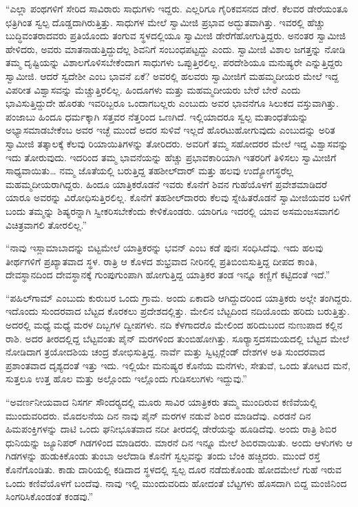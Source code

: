  “ಎಲ್ಲಾ ಪಂಥಗಳಿಗೆ ಸೇರಿದ ಸಾವಿರಾರು ಸಾಧುಗಳು ಇದ್ದರು. ಎಲ್ಲರಿಗೂ ಗೈರಿಕವಸನದ ಡೇರೆ. ಕೆಲವರ ಡೇರೆಯಂತೂ ಛತ್ರಿಗಿಂತ ಸ್ವಲ್ಪ ದೊಡ್ಡದಾಗಿರುತ್ತಿತ್ತು. ಸಾಧುಗಳ ಮೇಲೆ ಸ್ವಾಮೀಜಿ ಪ್ರಭಾವ ಅದ್ಭುತವಾಗಿತ್ತು. ಇವರಲ್ಲಿ ಹೆಚ್ಚು ಬುದ್ಧಿವಂತರಾದವರು ಪ್ರತಿಯೊಂದು ತಂಗುವ ಸ್ಥಳದಲ್ಲಿಯೂ ಸ್ವಾಮೀಜಿ ಡೇರೆಗೆ\break ಹೋಗುತ್ತಿದ್ದರು. ಅನಂತರ ಸ್ವಾಮೀಜಿ ಹೇಳಿದರು, ಅವರು ಮಾತನಾಡುತ್ತಿದ್ದುದೆಲ್ಲ ಶಿವನಿಗೆ ಸಂಬಂಧಪಟ್ಟದ್ದು ಎಂದು. ಸ್ವಾಮೀಜಿ ವಿಶಾಲ ಜಗತ್ತನ್ನು ನೋಡಿ ತಮ್ಮ ದೃಷ್ಟಿಯನ್ನು ವಿಶಾಲಗೊಳಿಸಬೇಕೆಂದಾಗ ಸಾಧುಗಳು ಒಪ್ಪುತ್ತಿರಲಿಲ್ಲ. ಪರದೇಶಿಯೂ ಮನುಷ್ಯರೇ ಎನ್ನುತ್ತಿದ್ದರು ಸ್ವಾಮೀಜಿ. ಆದರೆ ಸ್ವದೇಶೀ ಎಂಬ ಭಾವನೆ ಏಕೆ? ಅವರಲ್ಲಿ ಹಲವರು ಸ್ವಾಮೀಜಿಗೆ ಮಹಮ್ಮದೀಯರ ಮೇಲೆ ಇದ್ದ ವಿಪರೀತ ವಿಶ್ವಾಸವನ್ನು ಮೆಚ್ಚುತ್ತಿರಲಿಲ್ಲ. ಹಿಂದೂಗಳು ಮತ್ತು ಮಹಮ್ಮದೀಯರು ಬೇರೆ ಬೇರೆ ಎಂದು ಭಾವಿಸುತ್ತಿದ್ದುದೇ ಹೊರತು ಇವರಿಬ್ಬರೂ ಒಂದಾಗಬಲ್ಲರು ಎಂಬುದು ಅವರ ಭಾವನೆಗೂ ಸಿಲುಕದ ವಸ್ತುವಾಗಿತ್ತು. ಪಂಜಾಬು ಹಿಂದೂ ಧರ್ಮಕ್ಕಾಗಿ ಸತ್ತವರ ನೆತ್ತರಿಂದ ಒಣಗಿದೆ. ಇಲ್ಲಿಯಾದರೂ ಸ್ವಲ್ಪ ಮತಾಂಧತೆಯನ್ನು ಅಭ್ಯಾಸಮಾಡಬೇಕೆಂಬ ಅವರ ಇಚ್ಛೆ ಮುಂದೆ ಅದರ ಸುಳಿವೆ ಇಲ್ಲದೆ ಹೊರಟುಹೋಗುವುದು ಎಂಬುದನ್ನು ಅರಿತ ಸ್ವಾಮೀಜಿ ತತ್ಕಾಲಕ್ಕೆ ಕೆಲವು ರಿಯಾಯಿತಿಗಳನ್ನು ತೋರಿದರು. ಅವರಿಗೆ ತಮ್ಮ ಸಹೋದರರ ಮೇಲೆ ಇದ್ದ ವಿಶ್ವಾಸವನ್ನು ಇದು ತೋರುವುದು. ಇದರಿಂದ ತಮ್ಮ ಭಾವನೆಯನ್ನು ಹೆಚ್ಚು ಪ್ರಭಾವಕಾರಿಯಾಗಿ ಇತರರಿಗೆ ತಿಳಿಸಲು ಸ್ವಾಮೀಜಿಗೆ ಸಾಧ್ಯವಾಯಿತು… ನಮ್ಮ ಜೊತೆಯಲ್ಲಿ ಬರುತ್ತಿದ್ದ ತಹಶೀಲ್‍ದಾರ್ ಮತ್ತು ಹಲವು ಉದ್ಯೋಗಸ್ಥರೆಲ್ಲ ಮಹಮ್ಮದೀಯರಾಗಿದ್ದರು. ಹಿಂದೂ ಯಾತ್ರಿಕರೊಡನೆ ಇವರು ಕೊನೆಗೆ ಶಿವನ ಗುಹೆಯೊಳಗೆ ಪ್ರವೇಶಮಾಡಿದರೆ ಯಾರೂ ಅವರನ್ನು ವಿರೋಧಿಸುತ್ತಿರಲಿಲ್ಲ. ಕೊನೆಗೆ ತಹಶೀಲ್‍ದಾರರು ಕೆಲವು ಸ್ನೇಹಿತರೊಡನೆ ಸ್ವಾಮೀಜಿಯವರ ಬಳಿಗೆ ಬಂದು ತಮ್ಮನ್ನು ಶಿಷ್ಯರನ್ನಾಗಿ ಸ್ವೀಕರಿಸಬೇಕೆಂದು ಕೇಳಿಕೊಂಡರು. ಯಾರಿಗೂ ಇದರಲ್ಲಿ ಯಾವ ಅಸಮಂಜಸವಾಗಲಿ ವಿಚಿತ್ರವಾಗಲಿ ತೋರಲಿಲ್ಲ.” 

 “ನಾವು ಇಸ್ಲಾಮಾಬಾದನ್ನು ಬಿಟ್ಟಮೇಲೆ ಯಾತ್ರಿಕರನ್ನು ಭವನ್ ಎಂಬ ಕಡೆ ಪುನಃ ಸಂಧಿಸಿದೆವು. ಇದು ಹಲವು ತೀರ್ಥಗಳಿಗೆ ಪ್ರಖ್ಯಾತವಾದ ಸ್ಥಳ. ರಾತ್ರಿ ಆ ಕೊಳದ ಶುಭ್ರವಾದ ನೀರಿನಲ್ಲಿ ಪ್ರತಿಬಿಂಬಿಸುತ್ತಿದ್ದ ದೀಪದ ಕಾಂತಿ, ದೇವಸ್ಥಾನದಿಂದ ದೇವಸ್ಥಾನಕ್ಕೆ ಗುಂಪುಗುಂಪಾಗಿ ಹೋಗುತ್ತಿದ್ದ ಯಾತ್ರಿಕರ ತಂಡ ಇನ್ನೂ ಕಣ್ಣಿಗೆ ಕಟ್ಟಿದಂತೆ ಇದೆ.” 

 “ಪಹಿಲ್‍ಗಾಮ್ ಎಂಬುದು ಕುರುಬರ ಒಂದು ಗ್ರಾಮ. ಅಂದು ಏಕಾದಶಿ ಆಗಿದ್ದುದರಿಂದ ಯಾತ್ರಿಕರು ಅಲ್ಲೇ ತಂಗಿದ್ದರು. ಇದೊಂದು ಸುಂದರವಾದ ಬೆಟ್ಟದ ಕೊರಕಲು ಪ್ರದೇಶದಲ್ಲಿತ್ತು. ಮೇಲಿನ ಬೆಟ್ಟದಿಂದ ನದಿಯೊಂದು ಹರಿದು ಬರುತ್ತಿತ್ತು. ಅದರಲ್ಲಿ ಮಧ್ಯೆ ಮಧ್ಯೆ ಮರಳ ದಿಬ್ಬಗಳ ದ್ವೀಪಗಳು. ನದಿ ಕೆಳಗಾದರೊ ಮೇಲಿಂದ ಹರಿದುಬಂದ ನುಣುಪಾದ ಕಲ್ಲಿನ ರಾಶಿ. ಅದರ ತೀರದಲ್ಲಿದ್ದ ಬೆಟ್ಟವಂತು ಪೈನ್ ಮರಗಳಿಂದ ತುಂಬಿಹೋಗಿತ್ತು. ಸೂರ‍್ಯಾಸ್ತದಸಮಯದಲ್ಲಿ ಬೆಟ್ಟದ ಮೇಲೆ ನೋಡಿದಾಗ ತ್ರಯೋದಶಿಯ ಚಂದ್ರ ಶೋಭಿಸುತ್ತಿದ್ದ. ನಾರ್ವೆ ಮತ್ತು ಸ್ವಿಟ್ಸರ್‍ಲೆಂಡ್ ದೇಶಗಳ ಅತಿ ಸುಂದರವಾದ ಪ್ರಶಾಂತವಾದ ದೃಶ್ಯದಂತೆ ಇತ್ತು ಇದು. ಇಲ್ಲಿಯೇ ಮನುಷ್ಯರ ಕೊನೆಯ ಮನೆಗಳು, ಸೇತುವೆ, ಒಂದು ತೋಟದ ಮನೆ, ಸುತ್ತಲೂ ಉತ್ತ ಹೊಲ ಮತ್ತು ಅಲ್ಲೊಂದು ಇಲ್ಲೊಂದು ಗುಡಿಸಲುಗಳು ಇದ್ದುವು.”

 “ಅವರ್ಣನೀಯವಾದ ನಿಸರ್ಗ ಸೌಂದರ‍್ಯದಲ್ಲಿ ಮೂರು ಸಾವಿರ ಯಾತ್ರಿಕರು ತಮ್ಮ ಮುಂದಿರುವ ಕಣಿವೆಯಲ್ಲಿ ಮುಂದುವರಿದರು. ಮೊದಲನೆಯ ದಿನ ನಾವು ಪೈನ್ ಮರಗಳ ನಡುವೆ ಶಿಬಿರ ಮಾಡಿದೆವು. ಎರಡನೆ ದಿನ ಹಿಮಪಂಕ್ತಿಗಳನ್ನು ದಾಟಿ ಒಂದು ಘನೀಭೂತವಾದ ನದೀ ತೀರದಲ್ಲಿ ಡೇರೆಯನ್ನು ಹೂಡಿದೆವು. ಅಂದು ರಾತ್ರಿ ಶಿಬಿರ ಧುನಿಯನ್ನು ಜ್ಯೂನಿಪರ್ ಗಿಡಗಳಿಂದ ಮಾಡಿದರು. ಮಾರನೆ ದಿನ ಇನ್ನೂ ಮೇಲೆ ಶಿಬಿರವಾಯಿತು. ಅಂದು ಆಳುಗಳು ಆ ಗಿಡಗಳನ್ನು ಹುಡುಕಿಕೊಂಡು ತುಂಬಾ ಅಲೆದಾಡಿ ಕೊನೆಗೆ ಸ್ವಲ್ಪವನ್ನು ತಂದು ಬೆಂಕಿ ಹಚ್ಚಿದರು. ಮುಂದೆ ರಸ್ತೆ ಕೊನೆಗೊಂಡಿತು. ಕಾಡು ದಾರಿಯಲ್ಲಿ ಕಡಿದಾದ ಸ್ಥಳದಲ್ಲಿ ಸ್ವಲ್ಪ ದೂರ ನಡೆದುಕೊಂಡು ಹೋದಮೇಲೆ ಗುಹೆ ಇರುವ ಒಂದು ಕಣಿವೆಯೊಳಗೆ ಬಂದೆವು. ನಾವು ಇಲ್ಲಿ ಮುಂದುವರಿದು ಹೋದಂತೆ ಬೆಟ್ಟಗಳು ಹೊಸದಾಗಿ ಬಿದ್ದ ಮಂಜಿನಿಂದ ಸಿಂಗರಿಸಿಕೊಂಡಂತೆ ಕಂಡವು.” 

